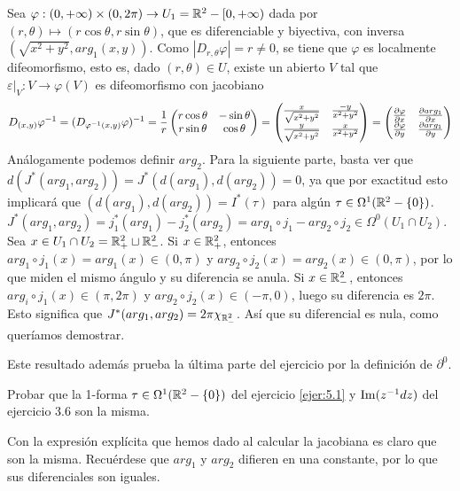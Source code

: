 \documentclass[twoside]{article}
\begin{document}
\begin{solucion}
Sea $\varphi:(0,+\infty)\times (0,2\pi)\to U_1=\mathbb{R}^2-[0,+\infty)$ dada por $(r,\theta)\mapsto (r\cos\theta, r\sin\theta)$, que es diferenciable y biyectiva,   con inversa $(\sqrt{x^2+y^2}, arg_1(x,y))$. Como $|D_{r,\theta}\varphi|=r\neq 0$, se tiene que $\varphi$ es localmente difeomorfismo, esto es, dado $(r,\theta)\in U$, existe un abierto $V$ tal que $\varepsilon|_V: V\to\varphi(V)$ es difeomorfismo con jacobiano 
\[
D_{(x,y)}\varphi^{-1}=(D_{\varphi^{-1}(x,y)}\varphi)^{-1}=\frac{1}{r}\begin{pmatrix}
r\cos\theta & -\sin\theta\\
r\sin\theta & \cos\theta
\end{pmatrix}=\begin{pmatrix}
\frac{x}{\sqrt{x^2+y^2}} & \frac{-y}{x^2+y^2}\\
\frac{y}{\sqrt{x^2+y^2}} & \frac{x}{x^2+y^2}
\end{pmatrix}=\begin{pmatrix}
\frac{\partial \varphi}{\partial x} & \frac{\partial arg_1}{\partial x}\\
\frac{\partial \varphi}{\partial y} & \frac{\partial arg_1}{\partial y}
\end{pmatrix}
\]
Análogamente podemos definir $arg_2$. Para la siguiente parte, basta ver que $d(J^*(arg_1,arg_2))=J^*(d(arg_1),d(arg_2))=0$, ya que por exactitud esto implicará que $(d(arg_1),d(arg_2))=I^*(\tau)$ para algún $\tau\in\Omega^1(\mathbb{R}^2-\{0\})$. 
$J^*(arg_1,arg_2)=j^*_1(arg_1)-j_2^*(arg_2)=arg_1\circ j_1-arg_2\circ j_2\in\Omega^0(U_1\cap U_2)$. Sea $x\in U_1\cap U_2=\mathbb{R}^2_+\sqcup \mathbb{R}^2_-$. Si $x\in\mathbb{R}^2_+$, entonces $arg_1\circ j_1(x)=arg_1(x)\in (0,\pi)$ y $arg_2\circ j_2(x)=arg_2(x)\in (0,\pi)$, por lo que miden el mismo ángulo y su diferencia se anula. Si $x\in\mathbb{R}^2_-$, entonces $arg_i\circ j_1(x)\in (\pi,2\pi)$ y $arg_2\circ j_2(x)\in (-\pi, 0)$, luego su diferencia es $2\pi$. Esto significa que 
$J^*(arg_1,arg_2)=2\pi\chi_{\mathbb{R}^2_-}$. Así que su diferencial es nula, como queríamos demostrar.

Este resultado además prueba la última parte del ejercicio por la definición de $\partial^0$. 
\end{solucion}

\newpage

\begin{ejercicio}{5.2}
Probar que la 1-forma $\tau\in\Omega^1(\mathbb{R}^2-\{0\})$ del ejercicio \ref{ejer:5.1} y $\operatorname{Im}(z^{-1}dz)$ del ejercicio 3.6 son la misma. %
\end{ejercicio}
\begin{solucion}

Con la expresión explícita que hemos dado al calcular la jacobiana es claro que son la misma. Recuérdese que $arg_1$ y $arg_2$ difieren en una constante, por lo que sus diferenciales son iguales. 

\end{solucion}
\newpage
\end{document}
